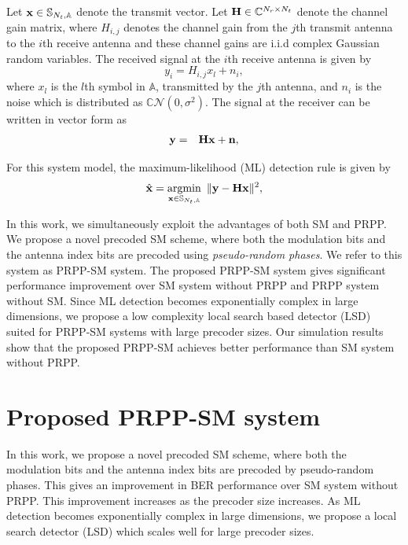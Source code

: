 \documentclass[11pt, onecolumn]{report}
\newcommand{\argmin}{\operatornamewithlimits{argmin}}
\newcommand{\vx}{{\bf x}}
\newcommand{\vy}{{\bf y}}
\newcommand{\vn}{{\bf n}}
\newcommand{\mh}{{\bf H}}
\newcommand{\sm}{{\mathbb S}_{N_t,{\mathbb A}}}
\begin{document}
\vspace{-4mm}
Let $\vx \in {\mathbb S}_{N_t,{\mathbb A}}$ denote the transmit vector.
Let $\mh \in \mathbb{C}^{N_r\times N_t}$ denote the channel gain matrix,
where $H_{i,j}$ denotes the channel gain from the $j$th transmit antenna 
to the $i$th receive antenna and these channel gains are i.i.d complex 
Gaussian random variables. The received signal at the $i$th receive 
antenna is given by
\begin{equation}
y_i = H_{i,j}x_l + n_i,
\end{equation}
where $x_l$ is the $l$th symbol in ${\mathbb A}$, transmitted by the 
$j$th antenna, and $n_i$ is the noise which is distributed as
${\mathbb C}{\mathcal N}(0,\sigma^2)$. The signal at the receiver
can be written in vector form as
\begin{eqnarray}
\vy& = & \mh\vx+\vn,
\end{eqnarray}

For this system model, the maximum-likelihood (ML) detection rule is 
given by
\begin{equation} 
\label{ml1} 
\hat{\vx}=\argmin_{\vx\in \sm} \ \|\vy-\mh\vx\|^2,  
\end{equation}



In this work, we simultaneously exploit the advantages of both SM and PRPP. We propose a novel precoded SM scheme, where both the modulation bits and the antenna index bits are precoded using 
{\em pseudo-random phases}. We refer to this system as PRPP-SM system. The proposed PRPP-SM system gives significant performance improvement over SM system  without PRPP and PRPP system without SM. Since ML detection becomes exponentially complex in large dimensions, we propose a low complexity local search based detector (LSD) suited for PRPP-SM systems with large precoder 
sizes. Our simulation results show that  the proposed PRPP-SM achieves better performance than SM system without PRPP.
\chapter{Proposed PRPP-SM system}


In this work, we propose a novel precoded SM scheme, where
both the modulation bits and the antenna index bits are precoded by
pseudo-random phases. This gives an improvement in BER performance over SM system without PRPP. This improvement increases as the precoder size increases. As ML detection becomes exponentially complex in large 
dimensions, we propose a local search detector (LSD) which scales well for large precoder 
sizes. 
\end{document}
